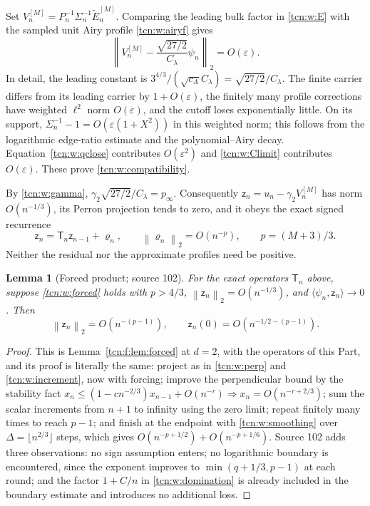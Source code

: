 \documentclass[11pt,letterpaper]{article}
\newcommand{\norm}[1]{\left\lVert#1\right\rVert}
\newcommand{\ip}[2]{\langle#1,#2\rangle}
\newcommand{\eps}{\varepsilon}
\newtheorem{lemma}[theorem]{Lemma}
\theoremstyle{remark}
\begin{document}
Set $V_n^{[M]}=P_n^{-1}\Sigma_n^{-1}\widetilde E_n^{[M]}$. Comparing the leading bulk factor in \eqref{tcn:w:E} with the sampled unit Airy profile \eqref{tcn:w:airyf} gives
\begin{equation}\label{tcn:w:compatibility}
 \norm{V_n^{[M]}-\frac{\sqrt{27/2}}{C_\lambda}\psi_n}_2=O(\eps).
\end{equation}
In detail, the leading constant is
$3^{4/3}/(\sqrt{c_A}C_\lambda)=\sqrt{27/2}/C_\lambda$.
The finite carrier differs from its leading carrier by $1+O(\eps)$, the finitely many profile corrections have weighted $\ell^2$ norm $O(\eps)$, and the cutoff loses exponentially little. On its support,
$\Sigma_n^{-1}-1=O(\eps(1+X^2))$ in this weighted norm; this follows from the logarithmic edge-ratio estimate and the polynomial--Airy decay. Equation~\eqref{tcn:w:qclose} contributes $O(\eps^2)$ and \eqref{tcn:w:Climit} contributes $O(\eps)$. These prove \eqref{tcn:w:compatibility}.

By \eqref{tcn:w:gamma}, $\gamma_2\sqrt{27/2}/C_\lambda=p_\infty$. Consequently
$\mathsf z_n=u_n-\gamma_2V_n^{[M]}$ has norm $O(n^{-1/3})$, its Perron projection tends to zero, and it obeys the exact signed recurrence
\begin{equation}\label{tcn:w:forced}
 \mathsf z_n=\mathsf T_n\mathsf z_{n-1}+\varrho_n,\qquad\norm{\varrho_n}_2=O(n^{-p}),\qquad p=(M+3)/3.
\end{equation}
Neither the residual nor the approximate profiles need be positive.

\begin{lemma}[Forced product; source 102]\label{tcn:w:lem:forced}
For the exact operators $\mathsf T_n$ above, suppose \eqref{tcn:w:forced} holds with $p>4/3$,
$\norm{\mathsf z_n}_2=O(n^{-1/3})$, and $\ip{\psi_n}{\mathsf z_n}\to0$. Then
\[
 \norm{\mathsf z_n}_2=O(n^{-(p-1)}),\qquad \mathsf z_n(0)=O(n^{-1/2-(p-1)}).
\]
\end{lemma}
\begin{proof}
This is Lemma~\ref{tcn:f:lem:forced} at $d=2$, with the operators of this Part, and its proof is literally the same: project as in \eqref{tcn:w:perp} and \eqref{tcn:w:increment}, now with forcing; improve the perpendicular bound by the stability fact $x_n\le(1-cn^{-2/3})x_{n-1}+O(n^{-r})\Rightarrow x_n=O(n^{-r+2/3})$; sum the scalar increments from $n+1$ to infinity using the zero limit; repeat finitely many times to reach $p-1$; and finish at the endpoint with \eqref{tcn:w:smoothing} over $\Delta=\lfloor n^{2/3}\rfloor$ steps, which gives $O(n^{-p+1/2})+O(n^{-p+1/6})$. Source 102 adds three observations: no sign assumption enters; no logarithmic boundary is encountered, since the exponent improves to $\min(q+1/3,p-1)$ at each round; and the factor $1+C/n$ in \eqref{tcn:w:domination} is already included in the boundary estimate and introduces no additional loss.
\end{proof}
\end{document}
